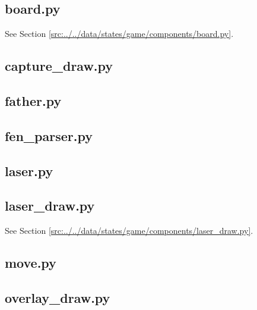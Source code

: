 \documentclass[../main/main.tex]{subfiles}
\begin{document}
\subsection{board.py}
See Section \ref{src:../../data/states/game/components/board.py}.

\subsection{capture\_draw.py}

\label{src:data/states/game/components/capture_draw.py}

\subsection{father.py}

\label{src:data/states/game/components/father.py}

\subsection{fen\_parser.py}

\label{src:data/states/game/components/fen_parser.py}

\subsection{laser.py}

\label{src:data/states/game/components/laser.py}

\subsection{laser\_draw.py}
See Section \ref{src:../../data/states/game/components/laser_draw.py}.

\subsection{move.py}

\label{src:data/states/game/components/move.py}

\subsection{overlay\_draw.py}

\label{src:data/states/game/components/overlay_draw.py}
\end{document}

